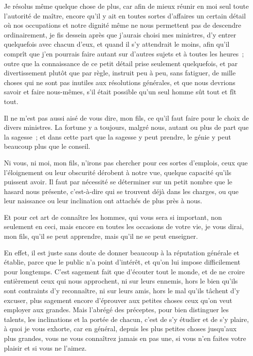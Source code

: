 \documentclass[french,twoside]{book} %
\begin{document}
Je résolus même quelque chose de plus, car afin de mieux réunir en moi seul toute l’autorité de maître, encore qu’il y ait en toutes sortes d’affaires un certain détail où nos occupations et notre dignité même ne nous permettent pas de descendre ordinairement, je fis dessein après que j’aurais choisi mes ministres, d’y entrer quelquefois avec chacun d’eux, et quand il s’y attendrait le moins, afin qu’il comprît que j’en pourrais faire autant sur d’autres sujets et à toutes les heures ; outre que la connaissance de ce petit détail prise seulement quelquefois, et par divertissement plutôt que par règle, instruit peu à peu, sans fatiguer, de mille choses qui ne sont pas inutiles aux résolutions générales, et que nous devrions savoir et faire nous-mêmes, s’il était possible qu’un seul homme sût tout et fît tout.\par
Il ne m’est pas aussi aisé de vous dire, mon fils, ce qu’il faut faire pour le choix de divers ministres. La fortune y a toujours, malgré nous, autant ou plus de part que la sagesse ; et dans cette part que la sagesse y peut prendre, le génie y peut beaucoup plus que le conseil.\par
Ni vous, ni moi, mon fils, n’irons pas chercher pour ces sortes d’emplois, ceux que l’éloignement ou leur obscurité dérobent à notre vue, quelque capacité qu’ils puissent avoir. Il faut par nécessité se déterminer sur un petit nombre que le hasard nous présente, c’est-à-dire qui se trouvent déjà dans les charges, ou que leur naissance ou leur inclination ont attachés de plus près à nous.\par
Et pour cet art de connaître les hommes, qui vous sera si important, non seulement en ceci, mais encore en toutes les occasions de votre vie, je vous dirai, mon fils, qu’il se peut apprendre, mais qu’il ne se peut enseigner.\par
En effet, il est juste sans doute de donner beaucoup à la réputation générale et établie, parce que le public n’a point d’intérêt, et qu’on lui impose difficilement pour longtemps. C’est sagement fait que d’écouter tout le monde, et de ne croire entièrement ceux qui nous approchent, ni sur leurs ennemis, hors le bien qu’ils sont contraints d’y reconnaître, ni sur leurs amis, hors le mal qu’ils tâchent d’y excuser, plus sagement encore d’éprouver aux petites choses ceux qu’on veut employer aux grandes. Mais l’abrégé des préceptes, pour bien distinguer les talents, les inclinations et la portée de chacun, c’est de s’y étudier et de s’y plaire, à quoi je vous exhorte, car en général, depuis les plus petites choses jusqu’aux plus grandes, vous ne vous connaîtrez jamais en pas une, si vous n’en faites votre plaisir et si vous ne l’aimez.\par
\end{document}
